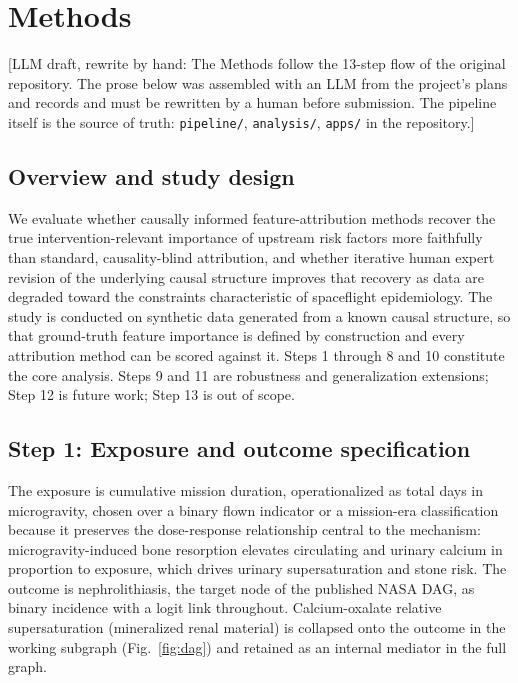 \documentclass[11pt]{article}
\newcommand{\draftnote}[1]{\textcolor{blue!60!black}{[LLM draft, rewrite by hand: #1]}}
\begin{document}
\section{Methods}
\draftnote{The Methods follow the 13-step flow of the original repository.
The prose below was assembled with an LLM from the project's plans and
records and must be rewritten by a human before submission. The pipeline
itself is the source of truth: \texttt{pipeline/}, \texttt{analysis/},
\texttt{apps/} in the repository.}

\subsection*{Overview and study design}
We evaluate whether causally informed feature-attribution methods recover
the true intervention-relevant importance of upstream risk factors more
faithfully than standard, causality-blind attribution, and whether iterative
human expert revision of the underlying causal structure improves that
recovery as data are degraded toward the constraints characteristic of
spaceflight epidemiology. The study is conducted on synthetic data generated
from a known causal structure, so that ground-truth feature importance is
defined by construction and every attribution method can be scored against
it. Steps 1 through 8 and 10 constitute the core analysis. Steps 9 and 11
are robustness and generalization extensions; Step 12 is future work; Step
13 is out of scope.

\subsection*{Step 1: Exposure and outcome specification}
The exposure is cumulative mission duration, operationalized as total days
in microgravity, chosen over a binary flown indicator or a mission-era
classification because it preserves the dose-response relationship central
to the mechanism: microgravity-induced bone resorption elevates circulating
and urinary calcium in proportion to exposure, which drives urinary
supersaturation and stone risk. The outcome is nephrolithiasis, the target
node of the published NASA DAG, as binary incidence with a logit link
throughout. Calcium-oxalate relative supersaturation (mineralized renal
material) is collapsed onto the outcome in the working subgraph
(Fig.~\ref{fig:dag}) and retained as an internal mediator in the full graph.
\end{document}
